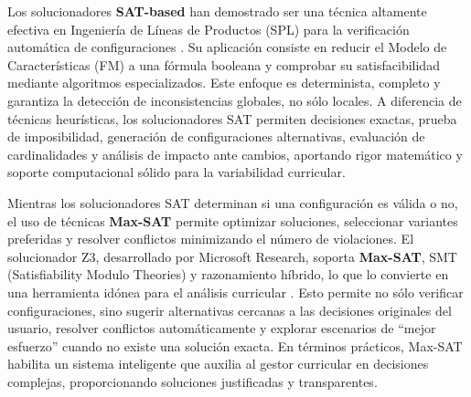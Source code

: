 {{        Los solucionadores \textbf{SAT-based} han demostrado ser una técnica 
        altamente efectiva en Ingeniería de Líneas de Productos (SPL) para la 
        verificación automática de configuraciones \citep{benavides2010a}. Su 
        aplicación consiste en reducir el Modelo de Características (FM) a una 
        fórmula booleana y comprobar su satisfacibilidad mediante algoritmos 
        especializados. Este enfoque es determinista, completo y garantiza la 
        detección de inconsistencias globales, no sólo locales. A diferencia de 
        técnicas heurísticas, los solucionadores SAT permiten decisiones exactas, 
        prueba de imposibilidad, generación de configuraciones alternativas, 
        evaluación de cardinalidades y análisis de impacto ante cambios, 
        aportando rigor matemático y soporte computacional sólido para la 
        variabilidad curricular.

        Mientras los solucionadores SAT determinan si una configuración es 
        válida o no, el uso de técnicas \textbf{Max-SAT} permite optimizar 
        soluciones, seleccionar variantes preferidas y resolver conflictos 
        minimizando el número de violaciones. El solucionador Z3, desarrollado 
        por Microsoft Research, soporta \textbf{Max-SAT}, SMT 
        (Satisfiability Modulo Theories) y razonamiento híbrido, lo que lo 
        convierte en una herramienta idónea para el análisis curricular 
        \citep{z3_2008}. Esto permite no sólo verificar configuraciones, 
        sino sugerir alternativas cercanas a las decisiones originales del 
        usuario, resolver conflictos automáticamente y explorar escenarios de 
        “mejor esfuerzo” cuando no existe una solución exacta. En términos 
        prácticos, Max-SAT habilita un sistema inteligente que auxilia al 
        gestor curricular en decisiones complejas, proporcionando soluciones 
        justificadas y transparentes.
    }

    
    }
